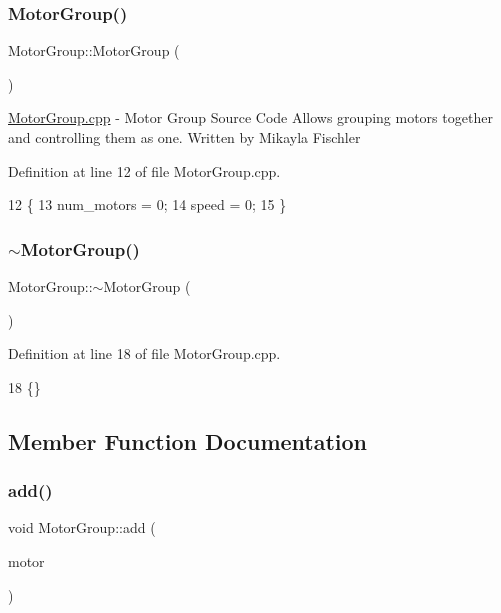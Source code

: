 \subsubsection{\texorpdfstring{Motor\+Group()}{MotorGroup()}}
{\footnotesize\ttfamily Motor\+Group\+::\+Motor\+Group (\begin{DoxyParamCaption}{ }\end{DoxyParamCaption})}

\hyperlink{_motor_group_8cpp}{Motor\+Group.\+cpp} -\/ Motor Group Source Code Allows grouping motors together and controlling them as one. Written by Mikayla Fischler 

Definition at line 12 of file Motor\+Group.\+cpp.


\begin{DoxyCode}
12                        \{
13     num\_motors = 0;
14     speed = 0;
15 \}
\end{DoxyCode}
\mbox{\label{class_motor_group_aff77909a09cada0bf7742de4c91ba630}} 
\subsubsection{\texorpdfstring{$\sim$\+Motor\+Group()}{~MotorGroup()}}
{\footnotesize\ttfamily Motor\+Group\+::$\sim$\+Motor\+Group (\begin{DoxyParamCaption}{ }\end{DoxyParamCaption})}



Definition at line 18 of file Motor\+Group.\+cpp.


\begin{DoxyCode}
18 \{\}
\end{DoxyCode}


\subsection{Member Function Documentation}
\mbox{\label{class_motor_group_addfa8105bc2fe799db770b7777a7ee4f}} 
\subsubsection{\texorpdfstring{add()}{add()}}
{\footnotesize\ttfamily void Motor\+Group\+::add (\begin{DoxyParamCaption}\item[{\hyperlink{class_v_e_x_motor}{V\+E\+X\+Motor} $\ast$}]{motor }\end{DoxyParamCaption})}



